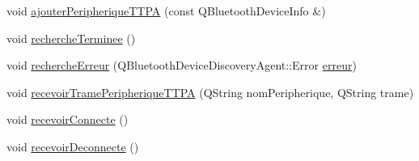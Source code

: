 \begin{DoxyCompactItemize}
\item 
void \hyperlink{class_communication_bluetooth_a53bc4772892ec57f030600e49fa0b6ff}{ajouter\+Peripherique\+T\+T\+PA} (const Q\+Bluetooth\+Device\+Info \&)
\item 
void \hyperlink{class_communication_bluetooth_a79ee5a5bcaaf265048f1213b5504f146}{recherche\+Terminee} ()
\item 
void \hyperlink{class_communication_bluetooth_ad9abca9e2e3fa0115cc92458a357e04d}{recherche\+Erreur} (Q\+Bluetooth\+Device\+Discovery\+Agent\+::\+Error \hyperlink{class_communication_bluetooth_a90c5c3c42145bad0f80a7a75d98dc253}{erreur})
\item 
void \hyperlink{class_communication_bluetooth_ae50bbbf70a5afdea0a0c4d3322e90e40}{recevoir\+Trame\+Peripherique\+T\+T\+PA} (Q\+String nom\+Peripherique, Q\+String trame)
\item 
void \hyperlink{class_communication_bluetooth_aee7edc20fc1fdfd5a5a1c228c1319531}{recevoir\+Connecte} ()
\item 
void \hyperlink{class_communication_bluetooth_af187cbc294befb656070f9817763104b}{recevoir\+Deconnecte} ()
\end{DoxyCompactItemize}
